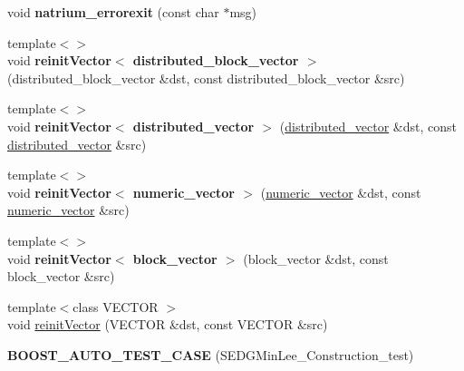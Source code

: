 \begin{DoxyCompactItemize}
\item 
\hypertarget{namespacenatrium_a4ee36100433ccf7e16ee3aa1b03a401e}{
void {\bfseries natrium\_\-errorexit} (const char $\ast$msg)}
\label{namespacenatrium_a4ee36100433ccf7e16ee3aa1b03a401e}

\item 
\hypertarget{namespacenatrium_a2a8dd72d47e91c7e67cd26ee06ea9318}{
{\footnotesize template$<$$>$ }\\void {\bfseries reinitVector$<$ distributed\_\-block\_\-vector $>$} (distributed\_\-block\_\-vector \&dst, const distributed\_\-block\_\-vector \&src)}
\label{namespacenatrium_a2a8dd72d47e91c7e67cd26ee06ea9318}

\item 
\hypertarget{namespacenatrium_a2a6a1717ec66f3598c956ee077e9aa7c}{
{\footnotesize template$<$$>$ }\\void {\bfseries reinitVector$<$ distributed\_\-vector $>$} (\hyperlink{namespacenatrium_a903d2b92917f582f2ff05f52160ab811}{distributed\_\-vector} \&dst, const \hyperlink{namespacenatrium_a903d2b92917f582f2ff05f52160ab811}{distributed\_\-vector} \&src)}
\label{namespacenatrium_a2a6a1717ec66f3598c956ee077e9aa7c}

\item 
\hypertarget{namespacenatrium_ae4f0884b841c84392ef76f5cef13b798}{
{\footnotesize template$<$$>$ }\\void {\bfseries reinitVector$<$ numeric\_\-vector $>$} (\hyperlink{namespacenatrium_a67c39077adc6634f8fa3762b8eef24c4}{numeric\_\-vector} \&dst, const \hyperlink{namespacenatrium_a67c39077adc6634f8fa3762b8eef24c4}{numeric\_\-vector} \&src)}
\label{namespacenatrium_ae4f0884b841c84392ef76f5cef13b798}

\item 
\hypertarget{namespacenatrium_a60c08462f26b0566d3676ef72a77a289}{
{\footnotesize template$<$$>$ }\\void {\bfseries reinitVector$<$ block\_\-vector $>$} (block\_\-vector \&dst, const block\_\-vector \&src)}
\label{namespacenatrium_a60c08462f26b0566d3676ef72a77a289}

\item 
{\footnotesize template$<$class VECTOR $>$ }\\void \hyperlink{namespacenatrium_a95eedd6a35d489da1b939928d8cf40e0}{reinitVector} (VECTOR \&dst, const VECTOR \&src)
\item 
\hypertarget{namespacenatrium_ad78ce248f34db62b3d9bd2e6cf959cbc}{
{\bfseries BOOST\_\-AUTO\_\-TEST\_\-CASE} (SEDGMinLee\_\-Construction\_\-test)}
\label{namespacenatrium_ad78ce248f34db62b3d9bd2e6cf959cbc}


\end{DoxyCompactItemize}

